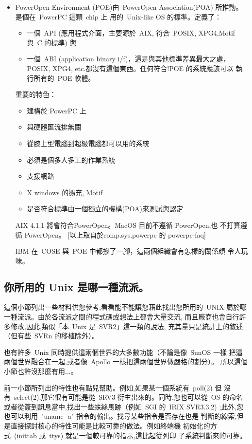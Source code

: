 \documentclass{article}
\begin{document}
\begin{CJK*}{Bg5}{ming}
{\begin{itemize}
      \item PowerOpen Environment (POE)由~PowerOpen Association(POA) 所推動。
        是個在~PowerPC 這顆~chip 上 用的~Unix-like OS 的標準。定義了： 
	\begin{itemize}
        \item 一個~API (應用程式介面，主要源於~AIX, 符合~POSIX,
          XPG4,Motif 與~C 的標準) 與
        \item 一個~ABI (application binary i/f)，這是與其他標準差異最大之處，
          POSIX, XPG4, etc.都沒有這個東西。任何符合!POE 的系統應該可以
          執行所有的~POE 軟體。
	\end{itemize}
        重要的特色：
	\begin{itemize}
        \item 建構於 PowerPC 上
        \item 與硬體匯流排無關
        \item 從膝上型電腦到超級電腦都可以用的系統
        \item 必須是個多人多工的作業系統
        \item 支援網路
        \item X windows 的擴充, Motif
        \item 是否符合標準由一個獨立的機構(POA)來測試與認定
	\end{itemize}
        AIX 4.1.1 將會符合PowerOpen。MacOS 目前不遵循 PowerOpen,也
        不打算遵循 PowerOpen。
        [以上取自於comp.sys.powerpc 的 powerpc-faq]

        IBM 在~COSE 與~POE 中都摻了一腳，這兩個組織會有怎樣的關係頗
        令人玩味。
\end{itemize}

\subsection{你所用的 Unix 是哪一種流派。}

    這個小節列出一些材料供您參考,看看能不能讓您藉此找出您所用的~UNIX
    屬於哪一種流派。由於各流派之間的程式碼或想法上都會大量交流,
    而且廠商也會自行許多修改,因此,類似「本~Unix 是~SVR2」這一類的說法,
    充其量只是統計上的敘述（但有些~SVRn 的移植除外）。

    也有許多~Unix 同時提供這兩個世界的大多數功能（不論是像~SunOS 一樣
    把這兩個世界融合在一起,或者像~Apollo 一樣把這兩個世界做嚴格的劃分）。
    所以這個小節也許沒那麼有用...。

    前一小節所列出的特性也有點兒幫助。例如,如果某一個系統有~poll(2) 但
    沒有~select(2),那它很有可能是從~SRV3 衍生出來的。同時,您也可以從~OS
    的命名或者從簽到訊息當中,找出一些蛛絲馬跡（例如~SGI 的~IRIX SVR3.3.2)
    ;此外,您也可以利用~"uname -a" 指令的輸出。找尋某些指令是否存在也是
    判斷的線索,但是直接探討核心的特性可能是比較可靠的做法。例如終端機
    初始化的方式~(inittab 或~ttys) 就是一個較可靠的指示,這比起從列印
    子系統判斷來的可靠。

}
\end{CJK*}
\end{document}
